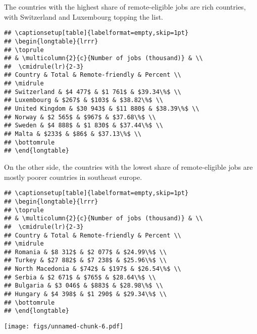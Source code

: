 \documentclass[11pt,]{article}
\begin{document}
The countries with the highest share of remote-eligible jobs are rich
countries, with Switzerland and Luxembourg topping the list.

\begin{verbatim}
## \captionsetup[table]{labelformat=empty,skip=1pt}
## \begin{longtable}{lrrr}
## \toprule
## & \multicolumn{2}{c}{Number of jobs (thousand)} & \\ 
##  \cmidrule(lr){2-3}
## Country & Total & Remote-friendly & Percent \\ 
## \midrule
## Switzerland & $4 477$ & $1 761$ & $39.34\%$ \\ 
## Luxembourg & $267$ & $103$ & $38.82\%$ \\ 
## United Kingdom & $30 943$ & $11 880$ & $38.39\%$ \\ 
## Norway & $2 565$ & $967$ & $37.68\%$ \\ 
## Sweden & $4 888$ & $1 830$ & $37.44\%$ \\ 
## Malta & $233$ & $86$ & $37.13\%$ \\ 
## \bottomrule
## \end{longtable}
\end{verbatim}

On the other side, the countries with the lowest share of
remote-eligible jobs are mostly poorer countries in southeast europe.

\begin{verbatim}
## \captionsetup[table]{labelformat=empty,skip=1pt}
## \begin{longtable}{lrrr}
## \toprule
## & \multicolumn{2}{c}{Number of jobs (thousand)} & \\ 
##  \cmidrule(lr){2-3}
## Country & Total & Remote-friendly & Percent \\ 
## \midrule
## Romania & $8 312$ & $2 077$ & $24.99\%$ \\ 
## Turkey & $27 882$ & $7 238$ & $25.96\%$ \\ 
## North Macedonia & $742$ & $197$ & $26.54\%$ \\ 
## Serbia & $2 671$ & $765$ & $28.64\%$ \\ 
## Bulgaria & $3 046$ & $883$ & $28.98\%$ \\ 
## Hungary & $4 398$ & $1 290$ & $29.34\%$ \\ 
## \bottomrule
## \end{longtable}
\end{verbatim}

\texttt{[image: figs/unnamed-chunk-6.pdf]}
\end{document}
